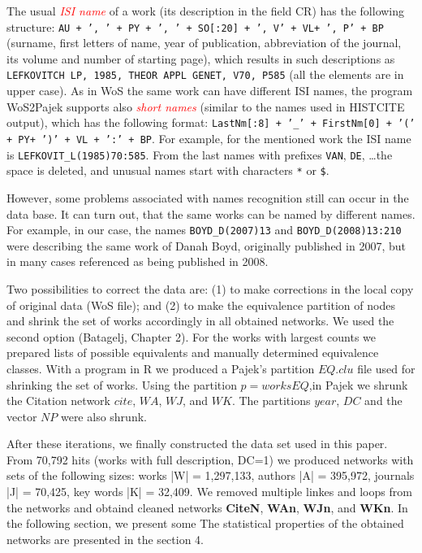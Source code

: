 \documentclass[11pt]{article} %
\newcommand{\keyw}[1]{\textcolor{red}{\emph{#1}}}
\begin{document}
The usual \keyw{ISI name} of a work (its description in the field CR) has the following structure: \texttt {AU {+ ', ' +} PY \texttt{+ ', ' +} SO[:20] \texttt{+ ', V' +} VL\texttt{+ ', P' +} BP} (surname, first letters of name, year of publication, abbreviation of the journal, its volume and number of starting page), which results in such descriptions as \texttt{LEFKOVITCH LP, 1985, THEOR APPL GENET, V70, P585} (all the elements are in upper case). As in WoS the same work can have different ISI names, the  program WoS2Pajek supports also \keyw{short names} (similar to the names used in HISTCITE output), which has the following format: \texttt {LastNm[:8] \texttt{+ '\_' +} FirstNm[0] \texttt{+ '(' +} PY\texttt{+ ')' +} VL \texttt{+ ':' +} BP}. For example, for the mentioned work the ISI name is \texttt{LEFKOVIT\_L(1985)70:585}. From the last names with prefixes \texttt{VAN}, \texttt{DE}, \ldots the space is deleted, and unusual names start with characters \texttt{*} or \texttt{\$}.\medskip 

However, some problems associated with names recognition still can occur in the data base. It can turn out, that the same works can be named by different names. For example, in our case, the names \texttt {BOYD\_D(2007)13} and \texttt {BOYD\_D(2008)13:210} were describing the same work of Danah Boyd, originally published in 2007, but in many cases referenced as being published in 2008. \medskip 

Two possibilities to correct the data are: (1) to make corrections in the local copy of original data (WoS file); and (2) to make the equivalence partition of nodes and shrink the set of works accordingly in all  obtained networks. We used the second option (Batagelj, Chapter 2). For the works with largest counts we prepared lists of possible equivalents and manually determined equivalence classes. With a program in R we produced a Pajek's partition $EQ.clu$ file used for shrinking the set of works. Using the partition $p=worksEQ$,in Pajek we shrunk the Citation network $cite$, $WA$, $WJ$, and $WK$. The partitions $year$,  $DC$ and the vector $NP$ were also shrunk.  \medskip 

After these iterations, we finally constructed the data set used in this paper. From 70,792 hits (works with full description, DC=1) we produced networks with sets of the following sizes: works |W| = 1,297,133, authors |A| = 395,972, journals |J| = 70,425, key words |K| = 32,409. We removed multiple linkes and loops from the networks and obtaind cleaned networks \textbf{CiteN}, \textbf{WAn}, \textbf{WJn}, and \textbf{WKn}. In the following section, we present some The statistical properties of the obtained networks are presented in the section 4. \medskip  
\end{document}
